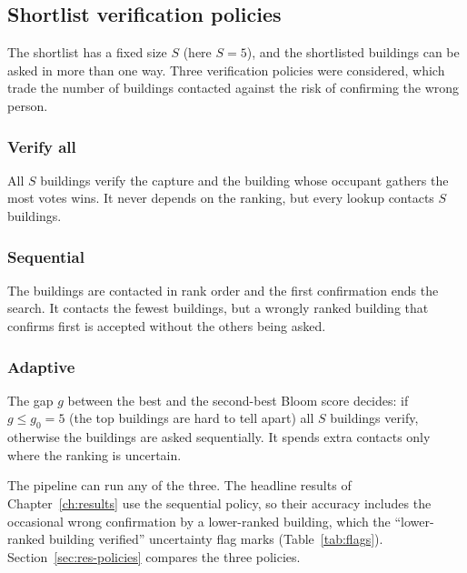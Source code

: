 \documentclass[12pt,a4paper,oneside]{report}
\begin{document}
\subsection{Shortlist verification policies}\label{sec:policies}
The shortlist has a fixed size $S$ (here $S=5$), and the shortlisted buildings can be asked in more than one way. Three verification policies were considered, which trade the number of buildings contacted against the risk of confirming the wrong person.

\subsubsection{Verify all}
All $S$ buildings verify the capture and the building whose occupant gathers the most votes wins. It never depends on the ranking, but every lookup contacts $S$ buildings.

\subsubsection{Sequential}
The buildings are contacted in rank order and the first confirmation ends the search. It contacts the fewest buildings, but a wrongly ranked building that confirms first is accepted without the others being asked.

\subsubsection{Adaptive}
The gap $g$ between the best and the second-best Bloom score decides: if $g\le g_0=5$ (the top buildings are hard to tell apart) all $S$ buildings verify, otherwise the buildings are asked sequentially. It spends extra contacts only where the ranking is uncertain.

The pipeline can run any of the three. The headline results of Chapter~\ref{ch:results} use the sequential policy, so their accuracy includes the occasional wrong confirmation by a lower-ranked building, which the ``lower-ranked building verified'' uncertainty flag marks (Table~\ref{tab:flags}). Section~\ref{sec:res-policies} compares the three policies.
\end{document}
